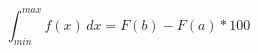 \documentclass[]{article}
\begin{document}
    \begin{equation*}
        \int_{min}^{max}f(x)\,dx=F(b)-F(a)*100
    \end{equation*}
\end{document}
